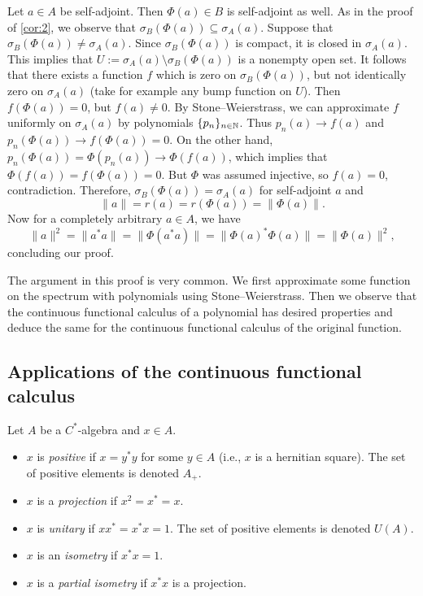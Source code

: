 \begin{myproof}
    Let $a \in A$ be self-adjoint. Then $\Phi (a) \in B$ is self-adjoint as well.
    As in the proof of \ref{cor:2}, we observe that $\sigma_B (\Phi (a)) \subseteq \sigma_A (a)$.
    Suppose that $\sigma_B (\Phi (a)) \neq \sigma_A (a)$.
    Since $\sigma_B (\Phi (a))$ is compact, it is closed in $\sigma_A (a)$. This implies that $U := \sigma_A (a) \setminus \sigma_B (\Phi (a))$
    is a nonempty open set. It follows that there exists a function $f$ which is zero on $\sigma_B (\Phi (a))$, but not identically zero on $\sigma_A (a)$
    (take for example any bump function on $U$). Then $f(\Phi(a)) = 0$, but $f(a) \neq 0$. By Stone--Weierstrass,
    we can approximate $f$ uniformly on $\sigma_A (a)$ by polynomials $\{ p_n \}_{n \in \mathbb {N}}$.
    Thus $p_n (a) \to f(a)$ and $p_n (\Phi (a)) \to f(\Phi (a)) = 0$.
    On the other hand, $ p_n (\Phi(a)) = \Phi (p_n (a)) \to \Phi (f(a))$,
    which implies that $\Phi (f(a)) = f(\Phi(a)) = 0.$
    But $\Phi$ was assumed injective, so $f(a) = 0$, contradiction.
    Therefore, $\sigma_B (\Phi (a)) = \sigma_A (a)$ for self-adjoint $a$ and
    $$\| a\| = r(a) = r(\Phi(a)) = \| \Phi(a)\|.$$
    Now for a completely arbitrary $a \in A$, we have 
    $$\| a\|^2 = \| a^* a\| = \| \Phi(a^* a)\| = \| \Phi(a)^* \Phi(a)\| = \| \Phi(a)\|^2,$$
    concluding our proof.
\end{myproof}

The argument in this proof is very common. We first approximate some function on the spectrum with polynomials 
    using Stone--Weierstrass. Then we observe that the continuous functional calculus of a polynomial has desired properties 
    and deduce the same for the continuous functional calculus of the original function.

\subsection{Applications of the continuous functional calculus}

\begin{definition}
  Let $A$ be a $C^*$-algebra and $x \in A$.
  \begin{itemize}
    \item $x$ is \emph{positive} if $x = y^* y$ for some $y \in A$ (i.e., $x$ is a hernitian square). The set of positive elements is denoted $A_+$.
    \item $x$ is a \emph{projection} if $x^2 = x^* = x$.
    \item $x$ is \emph{unitary} if $x x^* = x^* x = 1$. The set of positive elements is denoted $U(A)$.
    \item $x$ is an \emph{isometry} if $x^* x = 1$.
    \item $x$ is a \emph{partial isometry} if $x^* x$ is a projection.
  \end{itemize}
\end{definition}

